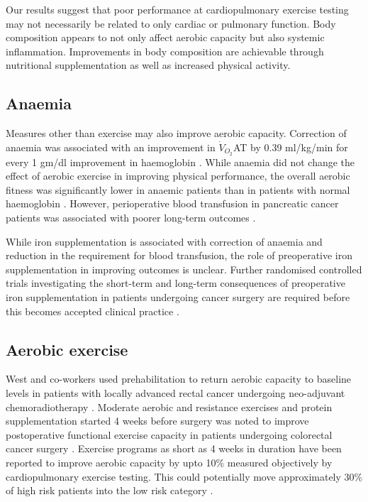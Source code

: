 Our results suggest that poor performance at cardiopulmonary exercise testing may not necessarily be related to only cardiac or pulmonary function. 
Body composition appears to not only affect aerobic capacity but also systemic inflammation. 
Improvements in body composition are achievable through nutritional supplementation \parencite{machado_whey_2015} as well as increased physical activity.



\subsection{Anaemia}

Measures other than exercise may also improve aerobic capacity. 
Correction of anaemia was associated with an improvement in $\dot{V}_{O_2}$AT by 0.39 ml/kg/min for every 1 gm/dl improvement in haemoglobin \parencite{wright_cardiopulmonary_2014}. 
While anaemia did not change the effect of aerobic exercise in improving physical performance, the overall aerobic fitness was significantly lower in anaemic patients than in patients with normal haemoglobin \parencite{bellotto_anemia_2011}.
However, perioperative blood transfusion in pancreatic cancer patients was associated with poorer long-term outcomes \parencite{kneuertz_effects_2011, sutton_perioperative_2014}.

While iron supplementation is associated with correction of anaemia and reduction in the requirement for blood transfusion, the role of preoperative iron supplementation in improving outcomes is unclear. 
Further randomised controlled trials investigating the short-term and long-term consequences of preoperative iron supplementation in patients undergoing cancer surgery are required before this becomes accepted clinical practice \parencite{beris_perioperative_2008,hallet_impact_2014}.

\subsection{Aerobic exercise}

West and co-workers used prehabilitation to return aerobic capacity to baseline levels in patients with locally advanced rectal cancer undergoing neo-adjuvant chemoradiotherapy \parencite{west_effect_2015}.
Moderate aerobic and resistance exercises and protein supplementation started 4 weeks before surgery was noted to improve postoperative functional exercise capacity in patients undergoing colorectal cancer surgery \parencite{gillis_prehabilitation_2014}.
Exercise programs as short as 4 weeks in duration have been reported to improve aerobic capacity by upto 10\%  measured objectively by cardiopulmonary exercise testing.
This could potentially move approximately 30\% of high risk patients into the low risk category \parencite{dunne_pmo-029_2012}.

